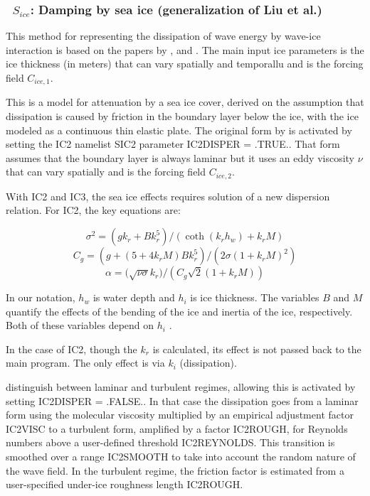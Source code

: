 \vsssub
\subsubsection{~$S_{ice}$: Damping by sea ice (generalization of Liu et al.)} \label{sec:ICE2}
\vsssub


\noindent
This method for representing the dissipation of wave energy by wave-ice interaction is based on the papers
by \cite{art:LMC88}, \cite{art:LHV91} and \cite{art:Aea15}. The main input ice parameters
is the ice thickness (in meters) that can vary spatially and temporallu and is the forcing field  ${C_{ice,1}}$. 

This is a model for attenuation by a
sea ice cover, derived on the assumption that dissipation is caused by
friction in the boundary layer below the ice,
with the ice modeled as a continuous thin elastic plate. The original form by  \cite{art:LMC88} is activated by 
setting the {\code IC2} namelist SIC2 parameter {\code IC2DISPER = .TRUE.}. That form 
 assumes that the boundary layer is always laminar but it uses an eddy viscosity ${\nu}$ that can vary spatially 
and is the forcing field ${C_{ice,2}}$. 

With {\code IC2} and {\code IC3}, the sea ice effects requires solution of a
new dispersion relation. For {\code IC2}, the key equations are:

\begin{equation}\label{eq:ice1}
  {\sigma}^2 = ({gk_r} + {Bk_r^5})/(\coth({k_r}{h_w}) + {k_r}{M})
\end{equation}
\begin{equation}\label{eq:ice2}
  {C_g} = (g + (5 + 4{k_r}{M}){B}{k_r^5})/(2{\sigma}(1+{k_r}{M})^2)
\end{equation}
\begin{equation}\label{eq:ice3}
  {\alpha} = (\sqrt{{\nu\sigma}}{k_r)}/({C_g}\sqrt{2}(1+{k_r}{M}))
\end{equation}

\noindent
In our notation, $h_w$ is water depth and $h_i$ is ice thickness.  The
variables $B$ and $M$ quantify the effects of the bending of the ice and
inertia of the ice, respectively. Both of these variables depend on $h_i$ 
\citep[see][]{art:LMC88, art:LHV91}.

\vspace{\baselineskip} \noindent
In the case of {\code IC2}, though the ${k_r}$ is calculated, its effect is
not passed back to the main program. The only effect is via ${k_i}$
(dissipation).


 \cite{art:Aea15} distinguish between laminar and 
turbulent regimes, allowing this is activated by setting  {\code IC2DISPER = .FALSE.}. 
In that case the dissipation goes from a laminar form using the molecular viscosity multiplied by an 
empirical adjustment factor {\code IC2VISC} to a turbulent form, amplified by a factor {\code IC2ROUGH}, for Reynolds numbers 
above a user-defined threshold {\code IC2REYNOLDS}. This transition is smoothed over a range {\code IC2SMOOTH} to take into 
account the random nature of the wave field. In the turbulent regime, the friction factor 
is estimated from a user-specified under-ice roughness length {\code IC2ROUGH}. 
